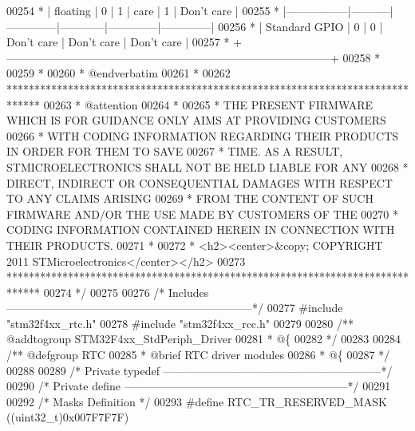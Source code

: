 \begin{DoxyCode}
00254 \textcolor{comment}{  * |    floating     |     0     |      1       |    care    |      1       |  Don't care  |}
00255 \textcolor{comment}{  * |-----------------|-----------|--------------|------------|--------------|--------------|}
00256 \textcolor{comment}{  * |  Standard GPIO  |     0     |      0       | Don't care |  Don't care  |  Don't care  |}
00257 \textcolor{comment}{  * +---------------------------------------------------------------------------------------+}
00258 \textcolor{comment}{  * }
00259 \textcolor{comment}{  *}
00260 \textcolor{comment}{  *  @endverbatim}
00261 \textcolor{comment}{  *}
00262 \textcolor{comment}{  ******************************************************************************}
00263 \textcolor{comment}{  * @attention}
00264 \textcolor{comment}{  *}
00265 \textcolor{comment}{  * THE PRESENT FIRMWARE WHICH IS FOR GUIDANCE ONLY AIMS AT PROVIDING CUSTOMERS}
00266 \textcolor{comment}{  * WITH CODING INFORMATION REGARDING THEIR PRODUCTS IN ORDER FOR THEM TO SAVE}
00267 \textcolor{comment}{  * TIME. AS A RESULT, STMICROELECTRONICS SHALL NOT BE HELD LIABLE FOR ANY}
00268 \textcolor{comment}{  * DIRECT, INDIRECT OR CONSEQUENTIAL DAMAGES WITH RESPECT TO ANY CLAIMS ARISING}
00269 \textcolor{comment}{  * FROM THE CONTENT OF SUCH FIRMWARE AND/OR THE USE MADE BY CUSTOMERS OF THE}
00270 \textcolor{comment}{  * CODING INFORMATION CONTAINED HEREIN IN CONNECTION WITH THEIR PRODUCTS.}
00271 \textcolor{comment}{  *}
00272 \textcolor{comment}{  * <h2><center>&copy; COPYRIGHT 2011 STMicroelectronics</center></h2>}
00273 \textcolor{comment}{  ******************************************************************************}
00274 \textcolor{comment}{  */}
00275 
00276 \textcolor{comment}{/* Includes ------------------------------------------------------------------*/}
00277 \textcolor{preprocessor}{#}\textcolor{preprocessor}{include} "stm32f4xx_rtc.h"
00278 \textcolor{preprocessor}{#}\textcolor{preprocessor}{include} "stm32f4xx_rcc.h"
00279 
00280 \textcolor{comment}{/** @addtogroup STM32F4xx\_StdPeriph\_Driver}
00281 \textcolor{comment}{  * @\{}
00282 \textcolor{comment}{  */}
00283 
00284 \textcolor{comment}{/** @defgroup RTC }
00285 \textcolor{comment}{  * @brief RTC driver modules}
00286 \textcolor{comment}{  * @\{}
00287 \textcolor{comment}{  */}
00288 
00289 \textcolor{comment}{/* Private typedef -----------------------------------------------------------*/}
00290 \textcolor{comment}{/* Private define ------------------------------------------------------------*/}
00291 
00292 \textcolor{comment}{/* Masks Definition */}
00293 \textcolor{preprocessor}{#}\textcolor{preprocessor}{define} \textcolor{preprocessor}{RTC\_TR\_RESERVED\_MASK}    \textcolor{preprocessor}{(}\textcolor{preprocessor}{(}\textcolor{preprocessor}{uint32\_t}\textcolor{preprocessor}{)}0x007F7F7F\textcolor{preprocessor}{)}

\end{DoxyCode}

